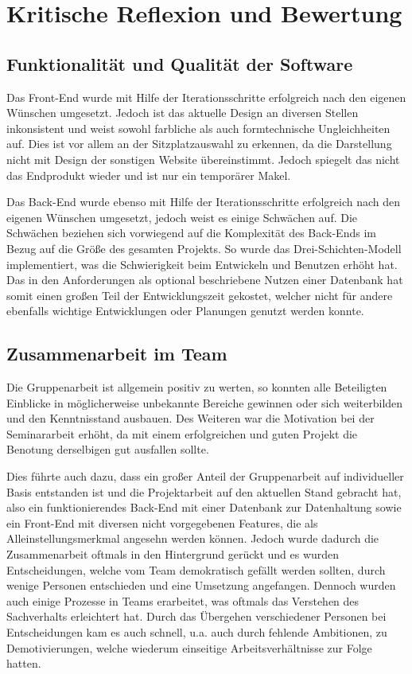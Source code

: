 \section{Kritische Reflexion und Bewertung}
\multipleauthorsection{\authorRF}{\authorEJ}

\subsection{Funktionalität und Qualität der Software}
\authorsection{\authorRF}

Das Front-End wurde mit Hilfe der Iterationsschritte erfolgreich nach den eigenen Wünschen umgesetzt.
Jedoch ist das aktuelle Design an diversen Stellen inkonsistent und weist sowohl farbliche als auch formtechnische Ungleichheiten auf.
Dies ist vor allem an der Sitzplatzauswahl zu erkennen, da die Darstellung nicht mit Design der sonstigen Website übereinstimmt.
Jedoch spiegelt das nicht das Endprodukt wieder und ist nur ein temporärer Makel.

Das Back-End wurde ebenso mit Hilfe der Iterationsschritte erfolgreich nach den eigenen Wünschen umgesetzt, jedoch weist es einige Schwächen auf.
Die Schwächen beziehen sich vorwiegend auf die Komplexität des Back-Ends im Bezug auf die Größe des gesamten Projekts.
So wurde das Drei-Schichten-Modell implementiert, was die Schwierigkeit beim Entwickeln und Benutzen erhöht hat.
Das in den Anforderungen als optional beschriebene Nutzen einer Datenbank hat somit einen großen Teil der Entwicklungszeit gekostet, welcher nicht für andere ebenfalls wichtige Entwicklungen oder Planungen genutzt werden konnte.

\subsection{Zusammenarbeit im Team}
\multipleauthorsection{\authorRF}{\authorEJ}

Die Gruppenarbeit ist allgemein positiv zu werten, so konnten alle Beteiligten Einblicke in möglicherweise unbekannte Bereiche gewinnen oder sich weiterbilden und den Kenntnisstand ausbauen.
Des Weiteren war die Motivation bei der Seminararbeit erhöht, da mit einem erfolgreichen und guten Projekt die Benotung derselbigen gut ausfallen sollte.

Dies führte auch dazu, dass ein großer Anteil der Gruppenarbeit auf individueller Basis entstanden ist und die Projektarbeit auf den aktuellen Stand gebracht hat, also ein funktionierendes Back-End mit einer Datenbank zur Datenhaltung sowie ein Front-End mit diversen nicht vorgegebenen Features, die als Alleinstellungsmerkmal angesehn werden können.
Jedoch wurde dadurch die Zusammenarbeit oftmals in den Hintergrund gerückt und es wurden Entscheidungen, welche vom Team demokratisch gefällt werden sollten, durch wenige Personen entschieden und eine Umsetzung angefangen. Dennoch wurden auch einige Prozesse in Teams erarbeitet, was oftmals das Verstehen des Sachverhalts erleichtert hat.
Durch das Übergehen verschiedener Personen bei Entscheidungen kam es auch schnell, u.a. auch durch fehlende Ambitionen, zu Demotivierungen, welche wiederum einseitige Arbeitsverhältnisse zur Folge hatten.

